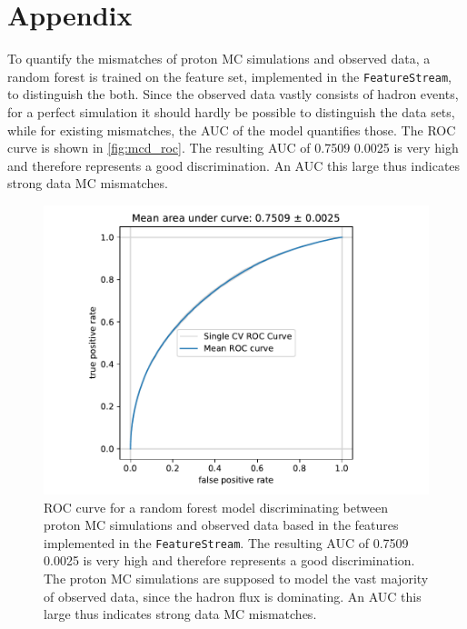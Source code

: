 \chapter{Appendix}
%
To quantify the mismatches of proton MC simulations and observed data, a random
forest is trained on the feature set, implemented in the \texttt{FeatureStream}, to distinguish the both. Since the
observed data vastly consists of hadron events, for a perfect simulation it
should hardly be possible to distinguish the data sets, while for existing
mismatches, the AUC of the model quantifies those. The ROC curve is shown in \autoref{fig:mcd_roc}. The resulting AUC of
0.7509\,\pm\,0.0025 is very high and therefore represents a good
discrimination. An AUC this large thus indicates strong data MC mismatches.
%
\begin{figure}
  \centering
  \includegraphics[width=\textwidth]{Plots/data_mc/data_mc_separation.pdf}
  \caption{ROC curve for a random forest model discriminating between proton MC simulations and observed data based in the features implemented in the \texttt{FeatureStream}. The resulting AUC of 0.7509\,\pm\,0.0025 is very high and therefore represents a good discrimination. The proton MC simulations are supposed to model the vast majority of observed data, since the hadron flux is dominating. An AUC this large thus indicates strong data MC mismatches.}
  \label{fig:mcd_roc}
\end{figure}
%

